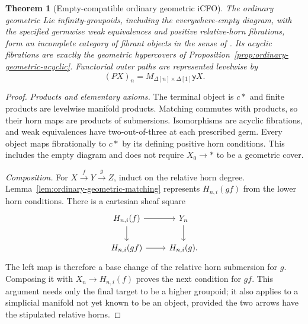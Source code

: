 \documentclass[12pt]{amsart}
\newtheorem{thm}{Theorem}[section]
\theoremstyle{definition}
\theoremstyle{remark}
\numberwithin{equation}{section}
\newcommand{\y}{\mathsf y}
\begin{document}
\begin{thm}[Empty-compatible ordinary geometric iCFO]
\label{thm:geometric-icfo}
The ordinary geometric Lie infinity-groupoids, including
the everywhere-empty diagram, with the specified germwise
weak equivalences and positive relative-horn fibrations,
form an incomplete category of fibrant objects in the
sense of \cite[Definition~2.1, p.~1134]{RogersZhu2020}.
Its acyclic fibrations are exactly the geometric
hypercovers of Proposition~\ref{prop:ordinary-geometric-acyclic}.
Functorial outer paths are represented levelwise by
\[
 (PX)_n=M_{\Delta[n]\times\Delta[1]}\y X.
\]
\end{thm}

\begin{proof}
\emph{Products and elementary axioms.}
The terminal object is $c*$ and finite products are
levelwise manifold products. Matching commutes with
products, so their horn maps are products of submersions.
Isomorphisms are acyclic fibrations, and weak equivalences
have two-out-of-three at each prescribed germ.
Every object maps fibrationally to $c*$ by its defining
positive horn conditions. This includes the empty diagram
and does not require $X_0\to *$ to be a geometric cover.

\emph{Composition.}
For $X\xrightarrow{f}Y\xrightarrow{g}Z$, induct on
the relative horn degree. Lemma~\ref{lem:ordinary-geometric-matching}
represents $H_{n,i}(gf)$ from the lower horn conditions.
There is a cartesian sheaf square
\[
\begin{tikzcd}
 H_{n,i}(f)\arrow[r]\arrow[d]
   &Y_n\arrow[d]\\
 H_{n,i}(gf)\arrow[r]
   &H_{n,i}(g).
\end{tikzcd}
\]
The left map is therefore a base change of the relative
horn submersion for $g$. Composing it with
$X_n\to H_{n,i}(f)$ proves the next condition for $gf$.
This argument needs only the final target to be a
higher groupoid; it also applies to a simplicial manifold
not yet known to be an object, provided the two arrows
have the stipulated relative horns.


\end{proof}
\end{document}
